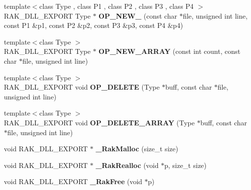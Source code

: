 \begin{DoxyCompactItemize}
\item 
\hypertarget{namespace_rak_net_a55e576481ad81aae8e18e07d67457be4}{{\footnotesize template$<$class Type , class P1 , class P2 , class P3 , class P4 $>$ }\\R\-A\-K\-\_\-\-D\-L\-L\-\_\-\-E\-X\-P\-O\-R\-T Type $\ast$ {\bfseries O\-P\-\_\-\-N\-E\-W\-\_} (const char $\ast$file, unsigned int line, const P1 \&p1, const P2 \&p2, const P3 \&p3, const P4 \&p4)}\label{namespace_rak_net_a55e576481ad81aae8e18e07d67457be4}

\item 
\hypertarget{namespace_rak_net_a698451f74317c4c40f64a94db75a16a1}{{\footnotesize template$<$class Type $>$ }\\R\-A\-K\-\_\-\-D\-L\-L\-\_\-\-E\-X\-P\-O\-R\-T Type $\ast$ {\bfseries O\-P\-\_\-\-N\-E\-W\-\_\-\-A\-R\-R\-A\-Y} (const int count, const char $\ast$file, unsigned int line)}\label{namespace_rak_net_a698451f74317c4c40f64a94db75a16a1}

\item 
\hypertarget{namespace_rak_net_ab8a5bdde3b78f58e78ee665e0233abde}{{\footnotesize template$<$class Type $>$ }\\R\-A\-K\-\_\-\-D\-L\-L\-\_\-\-E\-X\-P\-O\-R\-T void {\bfseries O\-P\-\_\-\-D\-E\-L\-E\-T\-E} (Type $\ast$buff, const char $\ast$file, unsigned int line)}\label{namespace_rak_net_ab8a5bdde3b78f58e78ee665e0233abde}

\item 
\hypertarget{namespace_rak_net_adb9431ae8d1a73248982f37faa49f4e5}{{\footnotesize template$<$class Type $>$ }\\R\-A\-K\-\_\-\-D\-L\-L\-\_\-\-E\-X\-P\-O\-R\-T void {\bfseries O\-P\-\_\-\-D\-E\-L\-E\-T\-E\-\_\-\-A\-R\-R\-A\-Y} (Type $\ast$buff, const char $\ast$file, unsigned int line)}\label{namespace_rak_net_adb9431ae8d1a73248982f37faa49f4e5}

\item 
\hypertarget{namespace_rak_net_a3777c7e87d859d2764f96f4904258533}{void R\-A\-K\-\_\-\-D\-L\-L\-\_\-\-E\-X\-P\-O\-R\-T $\ast$ {\bfseries \-\_\-\-Rak\-Malloc} (size\-\_\-t size)}\label{namespace_rak_net_a3777c7e87d859d2764f96f4904258533}

\item 
\hypertarget{namespace_rak_net_ac4e54ee03fc404178545ae2f4e1c9ed1}{void R\-A\-K\-\_\-\-D\-L\-L\-\_\-\-E\-X\-P\-O\-R\-T $\ast$ {\bfseries \-\_\-\-Rak\-Realloc} (void $\ast$p, size\-\_\-t size)}\label{namespace_rak_net_ac4e54ee03fc404178545ae2f4e1c9ed1}

\item 
\hypertarget{namespace_rak_net_a40725fa3a350665615707a759571e58c}{void R\-A\-K\-\_\-\-D\-L\-L\-\_\-\-E\-X\-P\-O\-R\-T {\bfseries \-\_\-\-Rak\-Free} (void $\ast$p)}\label{namespace_rak_net_a40725fa3a350665615707a759571e58c}


\end{DoxyCompactItemize}
